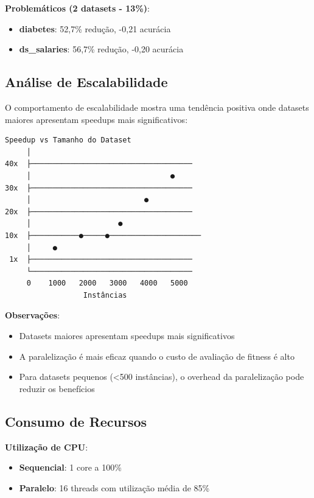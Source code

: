 \documentclass[12pt,a4paper]{article}
\begin{document}
\textbf{Problemáticos (2 datasets - 13\%)}:
\begin{itemize}
    \item \textbf{diabetes}: 52,7\% redução, -0,21 acurácia
    \item \textbf{ds\_salaries}: 56,7\% redução, -0,20 acurácia
\end{itemize}

\subsection{Análise de Escalabilidade}

O comportamento de escalabilidade mostra uma tendência positiva onde datasets maiores apresentam speedups mais significativos:

\begin{verbatim}
Speedup vs Tamanho do Dataset
     │
40x  ├─────────────────────────────────────
     │                                ●
30x  ├─────────────────────────────────────
     │                          ●
20x  ├─────────────────────────────────────
     │                    ●
10x  ├───────────●─────●─────────────────────
     │     ●
 1x  ├─────────────────────────────────────
     └─────────────────────────────────────
     0    1000   2000   3000   4000   5000
                  Instâncias
\end{verbatim}

\textbf{Observações}:
\begin{itemize}
    \item Datasets maiores apresentam speedups mais significativos
    \item A paralelização é mais eficaz quando o custo de avaliação de fitness é alto
    \item Para datasets pequenos (<500 instâncias), o overhead da paralelização pode reduzir os benefícios
\end{itemize}

\subsection{Consumo de Recursos}

\textbf{Utilização de CPU}:
\begin{itemize}
    \item \textbf{Sequencial}: 1 core a 100\%
    \item \textbf{Paralelo}: 16 threads com utilização média de 85\%
\end{itemize}
\end{document}
